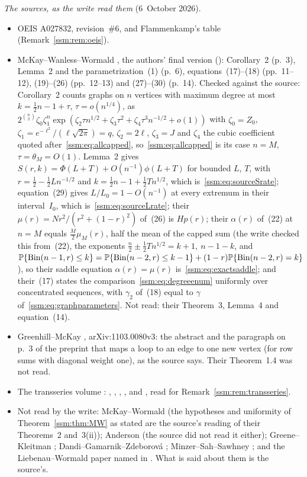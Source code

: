 \begin{writenote}
\emph{The sources, as the write read them} (6~October 2026).
\begin{itemize}\raggedright
\item OEIS A027832, revision~\#6, and Flammenkamp's table
 (Remark~\ref{ssm:rem:oeis}).
\item McKay--Wanless--Wormald \cite{mww}, the authors' final version
 (): Corollary~2 (p.~3), Lemma~2 and the
 parametrization~(1) (p.~6), equations~(17)--(18) (pp.~11--12),
 (19)--(26) (pp.~12--13) and (27)--(30) (p.~14). Checked against the
 source: Corollary~2 counts graphs on $n$ vertices with maximum degree at
 most $k=\tfrac12n-1+\tau$, $\tau=o(n^{1/4})$, as
 $2^{\binom n2}\zeta_0\zeta_1^n\exp(\zeta_2\tau n^{1/2}+\zeta_3\tau^2+\zeta_4\tau^3n^{-1/2}+o(1))$
 with $\zeta_0=Z_0$, $\zeta_1=e^{-\ell^2}/(\ell\sqrt{2\pi})=q$,
 $\zeta_2=2\ell$, $\zeta_3=J$ and $\zeta_4$ the cubic coefficient quoted
 after~\eqref{ssm:eq:allcapped}, so~\eqref{ssm:eq:allcapped} is its case
 $n=M$, $\tau=\theta_M=O(1)$. Lemma~2 gives
 $S(r,k)=\Phi(L+T)+O(n^{-1})\phi(L+T)$ for bounded $L$, $T$, with
 $r=\tfrac12-\tfrac12Ln^{-1/2}$ and $k=\tfrac12n-1+\tfrac12Tn^{1/2}$, which
 is~\eqref{ssm:eq:sourceSrate}; equation~(29) gives
 $L/L_0=1-O(n^{-1})$ at every extremum in their interval~$I_0$, which
 is~\eqref{ssm:eq:sourceLrate}; their $\mu(r)=Nr^2/(r^2+(1-r)^2)$ of~(26)
 is $Hp(r)$; their $\alpha(r)$ of~(22) at $n=M$ equals $\tfrac M2\mu_M(r)$, half the
 mean of the capped sum (the write checked this from~(22), the exponents
 $\tfrac n2\pm\tfrac12Tn^{1/2}=k+1,\ n-1-k$, and
 $\mathbb P\{\operatorname{Bin}(n-1,r)\le k\}=\mathbb P\{\operatorname{Bin}(n-2,r)\le k-1\}+(1-r)\mathbb P\{\operatorname{Bin}(n-2,r)=k\}$),
 so their saddle equation $\alpha(r)=\mu(r)$ is~\eqref{ssm:eq:exactsaddle};
 and their~(17) states the comparison~\eqref{ssm:eq:degreeenum}
 uniformly over concentrated sequences, with $\gamma_2$ of~(18) equal to
 $\gamma$ of~\eqref{ssm:eq:graphparameters}. Not read: their Theorem~3,
 Lemma~4 and equation~(14).
\item Greenhill--McKay \cite{gm}, arXiv:1103.0080v3: the abstract and the
 paragraph on p.~3 of the preprint that maps a loop to an edge to one new
 vertex (for row sums with diagonal weight one), as the source says. Their
 Theorem~1.4 was not read.
\item The transseries volume
 :
 , ,
 , ,
  and , read for
 Remark~\ref{ssm:rem:transseries}.
\item Not read by the write: McKay--Wormald \cite{mw} (the hypotheses and
 uniformity of Theorem~\ref{ssm:thm:MW} as stated are the source's reading
 of their Theorems~2 and~3(ii)); Anderson \cite{anderson} (the source did
 not read it either); Greene--Kleitman \cite{gk}; Dandi--Gamarnik--Zdeborov\'a
 \cite{dgz}; Minzer--Sah--Sawhney \cite{mss}; and the Liebenau--Wormald
 paper named in . What is said about them is the source's.
\end{itemize}


\end{writenote}
